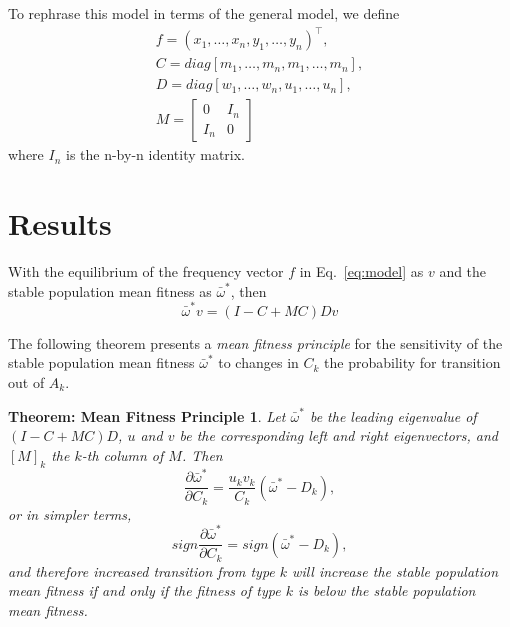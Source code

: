 \documentclass[9pt, a4paper, twocolumn]{extarticle}   	%
\newcommand*{\tr}{^\intercal}
\newtheorem*{mfp}{Theorem: Mean Fitness Principle}
\begin{document}
To rephrase this model in terms of the general model, we define
\begin{equation}
\begin{aligned}
f = (x_1, \ldots, x_n, y_1, \ldots, y_n)\tr, \\
C = diag[m_1, \ldots, m_n, m_1, \ldots, m_n], \\
D = diag[w_1, \ldots, w_n, u_1, \ldots, u_n], \\
M = \begin{bmatrix}
0 & I_n \\
I_n & 0
\end{bmatrix}
\end{aligned}
\end{equation}
where $I_n$ is the n-by-n identity matrix.

\section*{Results}

With the equilibrium of the frequency vector $f$ in Eq.~\ref{eq:model} as $v$ and the stable population mean fitness as $\bar{\omega}^*$, then
\begin{equation}\label{eq:model_equilibrium}
\bar{\omega}^* v = (I-C+MC)D v
\end{equation}

The following theorem presents a \emph{mean fitness principle} for the
sensitivity of the stable population mean fitness $\bar{\omega}^*$ to changes
in $C_k$ the probability for transition out of $A_k$.

\begin{mfp}
Let $\bar{\omega}^*$ be the leading eigenvalue of $(I-C+MC)D$, $u$ and $v$ be the corresponding left and right eigenvectors, and $[M]_k$ the $k$-th column of $M$. Then
\begin{equation}\label{eq:theorem}
\frac{\partial \bar{\omega}^*}{\partial C_k} = 
\frac{u_k v_k}{C_k} (\bar{\omega}^* - D_k),
\end{equation}
or in simpler terms,
\begin{equation}
sign\frac{\partial \bar{\omega}^*}{\partial C_k} = 
sign(\bar{\omega}^* - D_k), 
\end{equation}
and therefore increased transition from type $k$ will increase the stable population mean fitness if and only if the fitness of type $k$ is below the stable population mean fitness.
\end{mfp}
\end{document}
